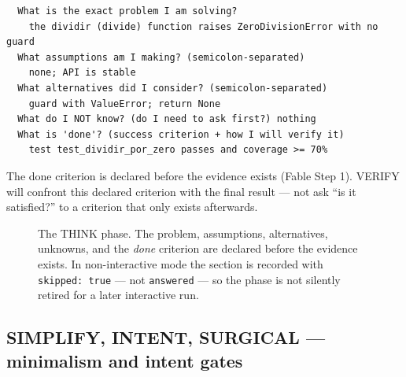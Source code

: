 \documentclass{sbc2019}%
\begin{document}
\begin{lstlisting}
  What is the exact problem I am solving?
    the dividir (divide) function raises ZeroDivisionError with no guard
  What assumptions am I making? (semicolon-separated)
    none; API is stable
  What alternatives did I consider? (semicolon-separated)
    guard with ValueError; return None
  What do I NOT know? (do I need to ask first?) nothing
  What is 'done'? (success criterion + how I will verify it)
    test test_dividir_por_zero passes and coverage >= 70%
\end{lstlisting}

The done criterion is declared before the evidence exists (Fable Step 1).
VERIFY will confront this declared criterion with the final result --- not
ask ``is it satisfied?'' to a criterion that only exists afterwards.


\begin{figure}[!ht]
\centering
{}
\caption{The THINK phase. The problem, assumptions, alternatives,
unknowns, and the \emph{done} criterion are declared before the evidence
exists. In non-interactive mode the section is recorded with
\texttt{skipped: true} --- not \texttt{answered} --- so the phase is not
silently retired for a later interactive run.}
\label{fig:think}
\end{figure}

\subsection{SIMPLIFY, INTENT, SURGICAL --- minimalism and intent gates}
\end{document}
